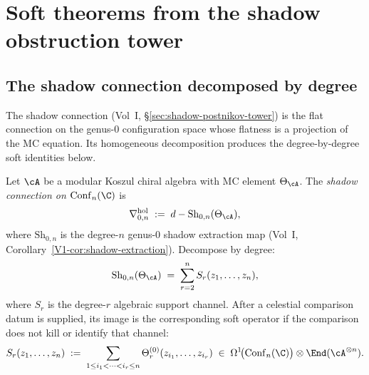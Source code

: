 
\section{Soft theorems from the shadow obstruction tower}

\subsection{The shadow connection decomposed by degree}

The shadow connection (Vol~I, \S\ref*{sec:shadow-postnikov-tower}) is the flat connection
on the genus-$0$ configuration space whose flatness is a projection of the MC equation.
Its homogeneous decomposition produces the degree-by-degree soft
identities below.

\begin{definition}
Let $\cA$ be a modular Koszul chiral algebra with MC element $\Theta_\cA$. The
\emph{shadow connection on $\mathrm{Conf}_n(\C)$} is
\begin{equation}
\nabla^{\mathrm{hol}}_{0,n}
\;:=\;
d - \mathrm{Sh}_{0,n}(\Theta_\cA),
\end{equation}
where $\mathrm{Sh}_{0,n}$ is the degree-$n$ genus-$0$ shadow extraction map
(Vol~I, Corollary~\ref*{V1-cor:shadow-extraction}). Decompose by degree:
\begin{equation}
\mathrm{Sh}_{0,n}(\Theta_\cA)
\;=\;
\sum_{r=2}^{n} S_r(z_1, \ldots, z_n),
\end{equation}
where \(S_r\) is the degree-\(r\) algebraic support channel.  After a
celestial comparison datum is supplied, its image is the corresponding
soft operator if the comparison does not kill or identify that channel:
\begin{equation}
S_r(z_1, \ldots, z_n)
\;:=\;
\sum_{1 \leq i_1 < \cdots < i_r \leq n}
\Theta^{(0)}_{r}(z_{i_1}, \ldots, z_{i_r})
\;\in\;
\Omega^1\!\bigl(\mathrm{Conf}_n(\C)\bigr)
\otimes \End(\cA^{\otimes n}).
\end{equation}
\end{definition}

